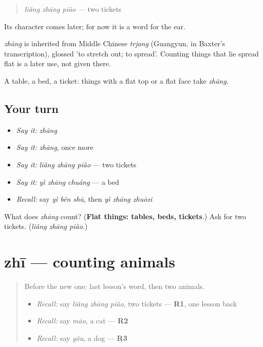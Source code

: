 \begin{quote}
\emph{liǎng zhāng piào} — two tickets
\end{quote}

Its character comes later; for now it is a word for the ear.

\begin{cousinweb}
\emph{zhāng} is inherited from Middle Chinese \emph{trjang} (Guangyun, in Baxter's transcription), glossed 'to stretch out; to spread'. Counting things that lie spread flat is a later use, not given there.
\end{cousinweb}

\begin{grammarlens}[title={What you've built}]
A table, a bed, a ticket: things with a flat top or a flat face take \emph{zhāng}.
\end{grammarlens}

\subsection*{Your turn}
\begin{itemize}
\raggedright
  \item \emph{Say it:} \emph{zhāng}
  \item \emph{Say it:} \emph{zhāng}, once more
  \item \emph{Say it:} \emph{liǎng zhāng piào} — two tickets
  \item \emph{Say it:} \emph{yì zhāng chuáng} — a bed
  \item \emph{Recall:} say \emph{yì běn shū}, then \emph{yì zhāng zhuōzi}
\end{itemize}

\begin{tcolorbox}[breakable,colback=teal!4,colframe=teal!35!black,title={Before you move on}]
What does \emph{zhāng} count? (\textbf{Flat things: tables, beds, tickets}.) Ask for two tickets. (\emph{liǎng zhāng piào}.)
\end{tcolorbox}
\section[zhī]{zhī — counting animals}

\label{lesson:ZH-C88-zhi}



\begin{quote}
Before the new one: last lesson's word, then two animals.

\begin{itemize}
\raggedright
  \item \emph{Recall:} say \emph{liǎng zhāng piào}, two tickets — \textbf{R1}, one lesson back
  \item \emph{Recall:} say \emph{māo}, a cat — \textbf{R2}
  \item \emph{Recall:} say \emph{gǒu}, a dog — \textbf{R3}
\end{itemize}
\end{quote}

